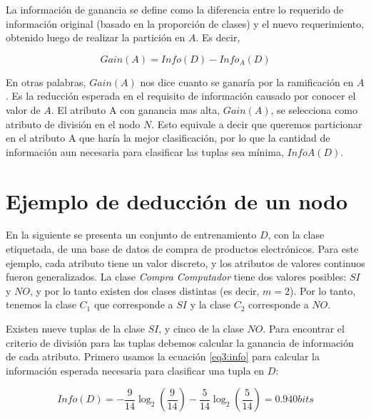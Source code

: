 La información de ganancia se define como la diferencia entre lo requerido de información original (basado en la proporción de clases) y el nuevo requerimiento, obtenido luego de realizar la partición en $A$. Es decir,

\begin{equation}
Gain(A) = Info(D) - Info_{A}(D)\label{eq3:ganancia}
\end{equation}

En otras palabras, $Gain(A)$ nos dice cuanto se ganaría por la ramificación en $A$. Es la reducción esperada en el requisito de información causado por conocer el valor de $A$. El atributo A con ganancia mas alta, $Gain(A)$, se selecciona como atributo de división en el nodo $N$. Esto equivale a decir que queremos particionar en el atributo A que haría la mejor clasificación, por lo que la cantidad de información aun necesaria para clasificar las tuplas sea mínima, $InfoA(D)$.



\section{Ejemplo de deducción de un nodo}

En la siguiente  se presenta un conjunto de entrenamiento $D$, con la clase etiquetada, de una base de datos de compra de productos electrónicos. Para este ejemplo, cada atributo tiene un valor discreto, y los atributos de valores continuos fueron generalizados. La clase \textit{Compra Computador} tiene dos valores posibles: $SI$ y $NO$, y por lo tanto existen dos clases distintas (es decir, $m=2$). Por lo tanto, tenemos la clase $C_1$ que corresponde a $SI$ y la clase $C_2$ corresponde a $NO$.

Existen nueve tuplas de la clase $SI$, y cinco de la clase $NO$. Para encontrar el criterio de división para las tuplas debemos calcular la ganancia de información de cada atributo. Primero usamos la ecuación \ref{eq3:info} para calcular la información esperada necesaria para clasificar una tupla en $D$:

\begin{equation*}
Info(D) = - \frac{9}{14}\log_2(\frac{9}{14}) - \frac{5}{14}\log_2(\frac{5}{14})	= 0.940 bits
\end{equation*}

